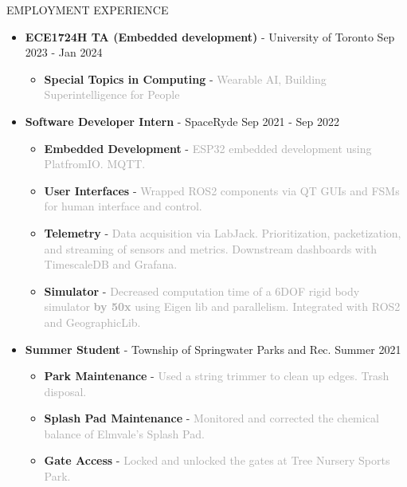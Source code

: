 \documentclass{resume} %
\begin{document}
\begin{rSection}{EMPLOYMENT EXPERIENCE}
    \begin{itemize}
        \item {\bf ECE1724H TA (Embedded development)} - University of Toronto \hfill {Sep 2023 - Jan 2024}
        \begin{itemize}[topsep=-10pt]
            \setlength\itemsep{-0.5em}
                \item[\textbullet] {\bf Special Topics in Computing} - \textcolor{darkgray}{Wearable AI, Building Superintelligence for People}
            \end{itemize}
        \item {\bf Software Developer Intern} - SpaceRyde \hfill {Sep 2021 - Sep 2022}
        \begin{itemize}[topsep=-10pt]
            \setlength\itemsep{-0.5em}
            \item[\textbullet] {\bf Embedded Development} - \textcolor{darkgray}{ESP32 embedded development using PlatfromIO. MQTT.}
            \item[\textbullet] {\bf User Interfaces} - \textcolor{darkgray}{Wrapped ROS2 components via QT GUIs and FSMs for human interface and control.}
            \item[\textbullet] {\bf Telemetry} - \textcolor{darkgray}{Data acquisition via LabJack. Prioritization, packetization, and streaming of sensors and metrics. Downstream dashboards with TimescaleDB and Grafana.}
            \item[\textbullet] {\bf Simulator} - \textcolor{darkgray}{Decreased computation time of a 6DOF rigid body simulator \textbf{by 50x} using Eigen lib and parallelism.
            Integrated with ROS2 and GeographicLib.}
        \end{itemize}
        \item {\bf Summer Student} - Township of Springwater Parks and Rec. \hfill {Summer 2021}
        \begin{itemize}[topsep=-10pt]
            \setlength\itemsep{-0.5em}
            \item[\textbullet] {\bf Park Maintenance} - \textcolor{darkgray}{Used a string trimmer to clean up edges. Trash disposal.}
            \item[\textbullet] {\bf Splash Pad Maintenance} - \textcolor{darkgray}{Monitored and corrected the chemical balance of Elmvale's Splash Pad.}
            \item[\textbullet] {\bf Gate Access} - \textcolor{darkgray}{Locked and unlocked the gates at Tree Nursery Sports Park.}

\end{itemize}
\end{itemize}
\end{rSection}
\end{document}
